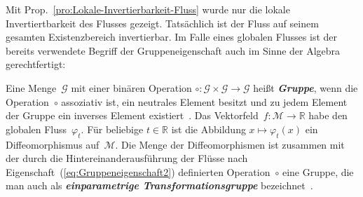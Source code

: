 Mit Prop.~\ref{pro:Lokale-Invertierbarkeit-Fluss} wurde nur die
lokale Invertiertbarkeit des Flusses gezeigt.
Tatsächlich ist der Fluss auf seinem gesamten Existenzbereich invertierbar.
Im Falle eines globalen Flusses ist der bereits verwendete Begriff
der Gruppen\-eigen\-schaft auch im Sinne der Algebra gerechtfertigt:
\begin{remark}
\label{rem:Gruppeneigenschaft}Eine Menge~$\mathcal{G}$
mit einer binären Operation $\circ:\mathcal{G}\times\mathcal{G}\to\mathcal{G}$
heißt \textbf{\em Gruppe}, wenn die Operation~$\circ$ assoziativ
ist, ein neutrales Element besitzt und zu jedem Element der Gruppe
ein inverses Element existiert~\cite{waerden1,bronstein2000,zeidler2003}.
Das Vektorfeld~$f:\mathcal{M}\to\mathbb{R}$ habe den globalen Fluss~$\varphi_{t}$.
Für beliebige $t\in\mathbb{R}$ ist die Abbildung $x\mapsto\varphi_{t}(x)$
ein Diffeomorphismus auf~$\mathcal{M}$.
Die Menge der Diffeomorphismen ist zusammen mit der durch die Hintereinanderausführung
der Flüsse nach Eigenschaft~(\ref{eq:Gruppeneigenschaft2}) definierten
Operation~$\circ$ eine Gruppe, die man auch als \textbf{\em einparametrige
Transformationsgruppe} bezeichnet~\cite{stephani1994,arnold2001,kuehnel2011}.
\end{remark}
\medskip{}


